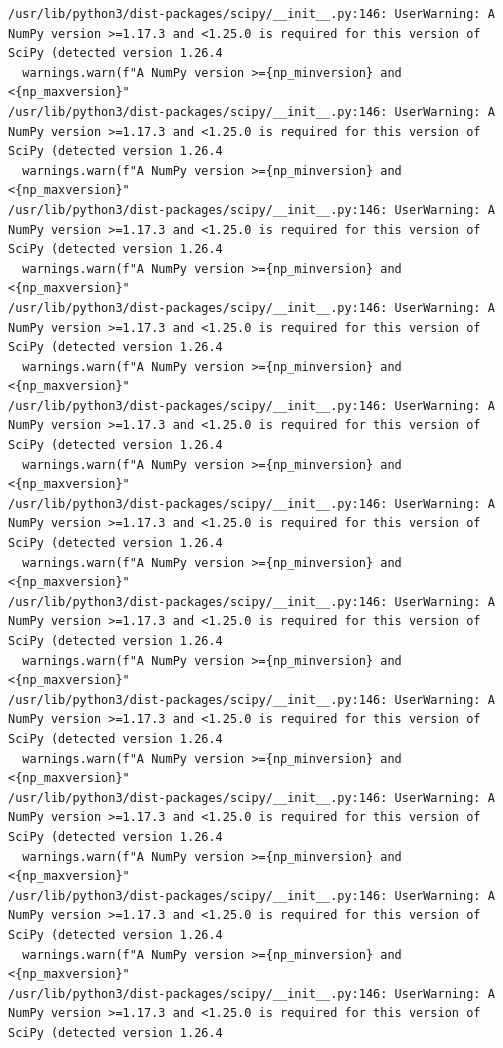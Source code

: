 \documentclass[11pt]{article}
\begin{document}
\begin{verbatim}
/usr/lib/python3/dist-packages/scipy/__init__.py:146: UserWarning: A NumPy version >=1.17.3 and <1.25.0 is required for this version of SciPy (detected version 1.26.4
  warnings.warn(f"A NumPy version >={np_minversion} and <{np_maxversion}"
/usr/lib/python3/dist-packages/scipy/__init__.py:146: UserWarning: A NumPy version >=1.17.3 and <1.25.0 is required for this version of SciPy (detected version 1.26.4
  warnings.warn(f"A NumPy version >={np_minversion} and <{np_maxversion}"
/usr/lib/python3/dist-packages/scipy/__init__.py:146: UserWarning: A NumPy version >=1.17.3 and <1.25.0 is required for this version of SciPy (detected version 1.26.4
  warnings.warn(f"A NumPy version >={np_minversion} and <{np_maxversion}"
/usr/lib/python3/dist-packages/scipy/__init__.py:146: UserWarning: A NumPy version >=1.17.3 and <1.25.0 is required for this version of SciPy (detected version 1.26.4
  warnings.warn(f"A NumPy version >={np_minversion} and <{np_maxversion}"
/usr/lib/python3/dist-packages/scipy/__init__.py:146: UserWarning: A NumPy version >=1.17.3 and <1.25.0 is required for this version of SciPy (detected version 1.26.4
  warnings.warn(f"A NumPy version >={np_minversion} and <{np_maxversion}"
/usr/lib/python3/dist-packages/scipy/__init__.py:146: UserWarning: A NumPy version >=1.17.3 and <1.25.0 is required for this version of SciPy (detected version 1.26.4
  warnings.warn(f"A NumPy version >={np_minversion} and <{np_maxversion}"
/usr/lib/python3/dist-packages/scipy/__init__.py:146: UserWarning: A NumPy version >=1.17.3 and <1.25.0 is required for this version of SciPy (detected version 1.26.4
  warnings.warn(f"A NumPy version >={np_minversion} and <{np_maxversion}"
/usr/lib/python3/dist-packages/scipy/__init__.py:146: UserWarning: A NumPy version >=1.17.3 and <1.25.0 is required for this version of SciPy (detected version 1.26.4
  warnings.warn(f"A NumPy version >={np_minversion} and <{np_maxversion}"
/usr/lib/python3/dist-packages/scipy/__init__.py:146: UserWarning: A NumPy version >=1.17.3 and <1.25.0 is required for this version of SciPy (detected version 1.26.4
  warnings.warn(f"A NumPy version >={np_minversion} and <{np_maxversion}"
/usr/lib/python3/dist-packages/scipy/__init__.py:146: UserWarning: A NumPy version >=1.17.3 and <1.25.0 is required for this version of SciPy (detected version 1.26.4
  warnings.warn(f"A NumPy version >={np_minversion} and <{np_maxversion}"
/usr/lib/python3/dist-packages/scipy/__init__.py:146: UserWarning: A NumPy version >=1.17.3 and <1.25.0 is required for this version of SciPy (detected version 1.26.4

\end{verbatim}
\end{document}
